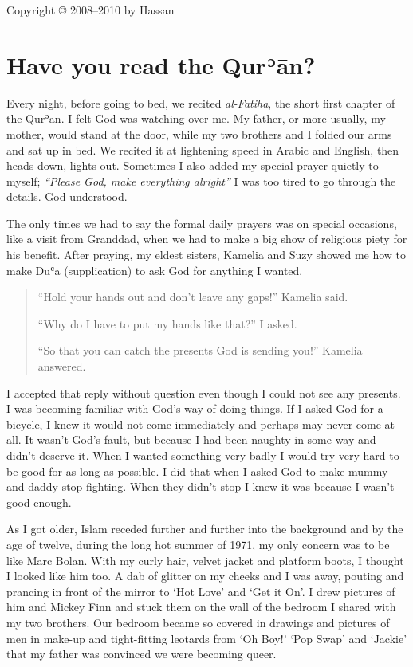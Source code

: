 \documentclass[12pt]{memoir}
\def\´{ʾ} %
\def\`{ʿ} %
\def \Quran{Qur\-\´ān} %
\def\–{-\hskip0pt}
\begin{document}
\hfill Copyright © 2008–2010 by Hassan

\mainmatter


\chapter{Have you read the \Quran?}


Every night, before going to bed, we recited \emph{al\–Fatiha},
the short first chapter of the \Quran.
I felt God was watching over me.
My father, or more usually, my mother, would stand at the door,
while my two brothers and I folded our arms and sat up in bed.
We recited it at lightening speed in Arabic and English,
then heads down, lights out.
Sometimes I also added my special prayer quietly to myself;
\emph{“Please God, make everything alright”}
I was too tired to go through the details.
God understood.

The only times we had to say the formal daily prayers was on special occasions,
like a visit from Granddad,
when we had to make a big show of religious piety for his benefit.
After praying, my eldest sisters, Kamelia and Suzy showed me
how to make Du\`a (supplication) to ask God for anything I wanted.

\begin{quote}
“Hold your hands out and don’t leave any gaps!” Kamelia said.

“Why do I have to put my hands like that?” I asked.

“So that you can catch the presents God is sending you!” Kamelia answered.
\end{quote}

I accepted that reply without question
even though I could not see any presents.
I was becoming familiar with God’s way of doing things.
If I asked God for a bicycle, I knew it would not come immediately
and perhaps may never come at all.
It wasn’t God’s fault, but because I had been naughty in some way
and didn’t deserve it.
When I wanted something very badly I would try very hard
to be good for as long as possible.
I did that when I asked God to make mummy and daddy stop fighting.
When they didn’t stop I knew it was because I wasn’t good enough.


As I got older, Islam receded further and further into the background
and by the age of twelve, during the long hot summer of 1971,
my only concern was to be like Marc Bolan.
With my curly hair, velvet jacket and platform boots,
I thought I looked like him too.
A dab of glitter on my cheeks and I was away,
pouting and prancing in front of the mirror to ‘Hot Love’ and ‘Get it On’.
I drew pictures of him and Mickey Finn
and stuck them on the wall of the bedroom I shared with my two brothers.
Our bedroom became so covered in drawings and pictures of men in make-up
and tight-fitting leotards from ‘Oh Boy!’ ‘Pop Swap’ and ‘Jackie’
that my father was convinced we were becoming queer.
\end{document}
